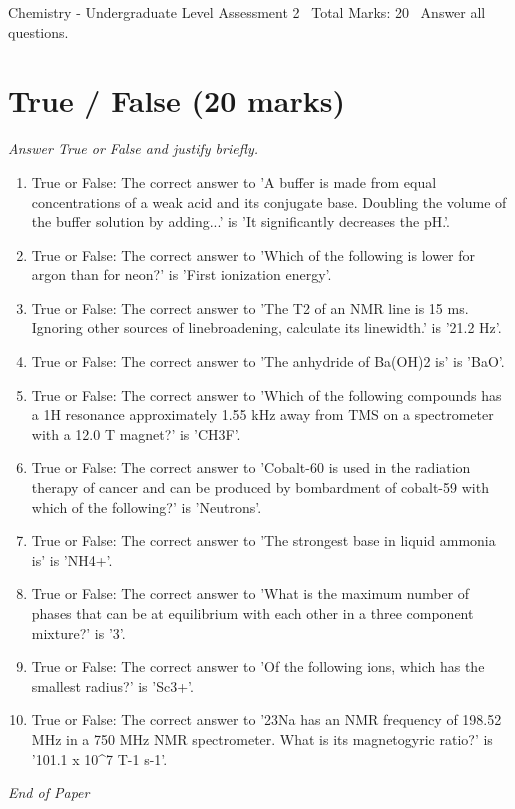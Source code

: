 \documentclass[12pt]{article}
\begin{document}
\begin{center}
Chemistry - Undergraduate Level Assessment 2 \
Total Marks: 20 \
Answer all questions.
\end{center}

\section*{True / False (20 marks)}
\textit{Answer True or False and justify briefly.}
\begin{enumerate}[label=\arabic*.]
\item True or False: The correct answer to 'A buffer is made from equal concentrations of a weak acid and its conjugate base. Doubling the volume of the buffer solution by adding...' is 'It significantly decreases the pH.'.
\item True or False: The correct answer to 'Which of the following is lower for argon than for neon?' is 'First ionization energy'.
\item True or False: The correct answer to 'The T2 of an NMR line is 15 ms. Ignoring other sources of linebroadening, calculate its linewidth.' is '21.2 Hz'.
\item True or False: The correct answer to 'The anhydride of Ba(OH)2 is' is 'BaO'.
\item True or False: The correct answer to 'Which of the following compounds has a 1H resonance approximately 1.55 kHz away from TMS on a spectrometer with a 12.0 T magnet?' is 'CH3F'.
\item True or False: The correct answer to 'Cobalt-60 is used in the radiation therapy of cancer and can be produced by bombardment of cobalt-59 with which of the following?' is 'Neutrons'.
\item True or False: The correct answer to 'The strongest base in liquid ammonia is' is 'NH4+'.
\item True or False: The correct answer to 'What is the maximum number of phases that can be at equilibrium with each other in a three component mixture?' is '3'.
\item True or False: The correct answer to 'Of the following ions, which has the smallest radius?' is 'Sc3+'.
\item True or False: The correct answer to '23Na has an NMR frequency of 198.52 MHz in a 750 MHz NMR spectrometer. What is its magnetogyric ratio?' is '101.1 x 10\^{}7 T-1 s-1'.
\end{enumerate}

\vfill
\noindent\textit{End of Paper}
\end{document}
